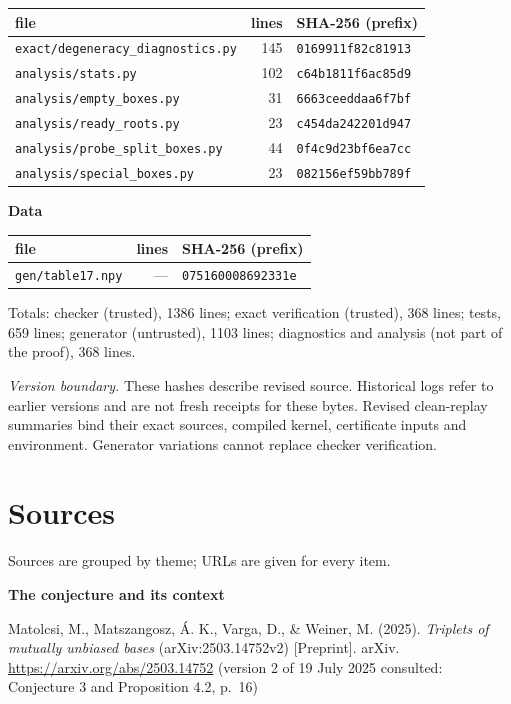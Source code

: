 \documentclass[
  11pt,
]{article}
\newcounter{none} %
\begin{document}
{\def\LTcaptype{none} %
\begin{longtable}[]{@{}lrl@{}}
\toprule\noalign{}
file & lines & SHA-256 (prefix) \\
\midrule\noalign{}
\endhead
\bottomrule\noalign{}
\endlastfoot
\texttt{exact/degeneracy\_diagnostics.py} & 145 &
\texttt{0169911f82c81913} \\
\texttt{analysis/stats.py} & 102 & \texttt{c64b1811f6ac85d9} \\
\texttt{analysis/empty\_boxes.py} & 31 & \texttt{6663ceeddaa6f7bf} \\
\texttt{analysis/ready\_roots.py} & 23 & \texttt{c454da242201d947} \\
\texttt{analysis/probe\_split\_boxes.py} & 44 &
\texttt{0f4c9d23bf6ea7cc} \\
\texttt{analysis/special\_boxes.py} & 23 & \texttt{082156ef59bb789f} \\
\end{longtable}
}

\textbf{Data}

{\def\LTcaptype{none} %
\begin{longtable}[]{@{}lrl@{}}
\toprule\noalign{}
file & lines & SHA-256 (prefix) \\
\midrule\noalign{}
\endhead
\bottomrule\noalign{}
\endlastfoot
\texttt{gen/table17.npy} & --- & \texttt{075160008692331e} \\
\end{longtable}
}

Totals: checker (trusted), 1386 lines; exact verification (trusted), 368
lines; tests, 659 lines; generator (untrusted), 1103 lines; diagnostics
and analysis (not part of the proof), 368 lines.

\emph{Version boundary.} These hashes describe revised source.
Historical logs refer to earlier versions and are not fresh receipts for
these bytes. Revised clean-replay summaries bind their exact sources,
compiled kernel, certificate inputs and environment. Generator
variations cannot replace checker verification.

\section{Sources}\label{sources}

Sources are grouped by theme; URLs are given for every item.

\textbf{The conjecture and its context}

Matolcsi, M., Matszangosz, Á. K., Varga, D., \& Weiner, M. (2025).
\emph{Triplets of mutually unbiased bases} (arXiv:2503.14752v2)
{[}Preprint{]}. arXiv. \url{https://arxiv.org/abs/2503.14752} (version 2
of 19 July 2025 consulted: Conjecture 3 and Proposition 4.2, p.~16)
\end{document}
